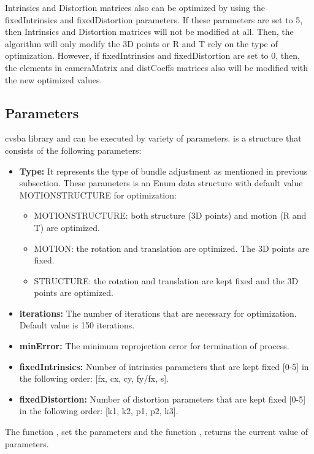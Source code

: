 Intrinsics and Distortion matrices also can be optimized by using the fixedIntrinsics and fixedDistortion parameters. If these parameters are set to 5, then Intrinsics and Distortion matrices will not be modified at all. Then, the algorithm will only modify the 3D points or R and T rely on the type of optimization. However, if fixedIntrinsics and fixedDistortion are set to 0, then, the elements in cameraMatrix and distCoeffs matrices also will be modified with the new optimized values.

\subsection{Parameters}
cvsba library and  can be executed by variety of parameters.  is a structure that consists of the following parameters:
\begin{itemize}
\item \textbf{Type:} It represents the type of bundle adjustment as mentioned in previous subsection. These parameters is an Enum data structure with default value MOTIONSTRUCTURE for optimization:
		\begin{itemize}
			\item MOTIONSTRUCTURE: both structure (3D points) and motion (R and T) are optimized.
			\item MOTION: the rotation and translation are optimized. The 3D points are fixed.
			\item STRUCTURE: the rotation and translation are kept fixed and the 3D points are optimized.
		\end {itemize}
\item \textbf{iterations:} The number of iterations that are necessary for optimization. Default value is 150 iterations.
\item \textbf{minError:} The minimum reprojection error for termination of process.
\item \textbf{fixedIntrinsics:} Number of intrinsics parameters that are kept fixed [0-5] in the following order: [fx, cx, cy, fy/fx, s].
\item \textbf{fixedDistortion:} Number of distortion parameters that are kept fixed [0-5] in the following order: [k1, k2, p1, p2, k3].
\end{itemize}

The function , set the parameters and the function , returns the current value of parameters.

